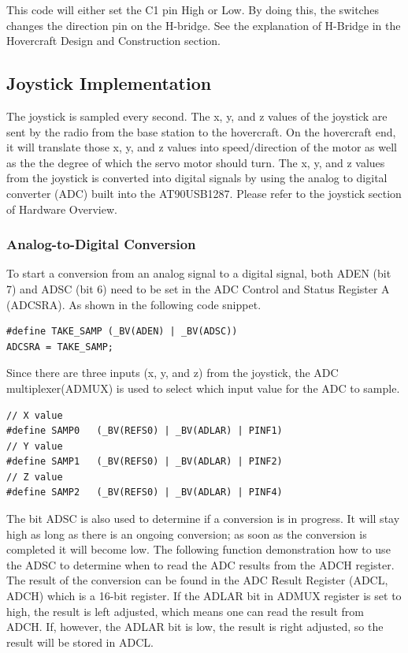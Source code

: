 This code will either set the C1 pin High or Low. By doing this, the switches changes the direction pin on the H-bridge. See the explanation of H-Bridge in the Hovercraft Design and Construction section. 

\subsection{Joystick Implementation}
The joystick is sampled every second. The x, y, and z values of the joystick are sent by the radio from the base station to the hovercraft. On the hovercraft end, it will translate those x, y, and z values into speed/direction of the motor as well as the the degree of which the servo motor should turn. The x, y, and z values from the joystick is converted into digital signals by using the analog to digital converter (ADC) built into the AT90USB1287. Please refer to the joystick section of Hardware Overview.

\subsubsection{Analog-to-Digital Conversion}
To start a conversion from an analog signal to a digital signal, both ADEN (bit 7) and ADSC (bit 6) need to be set in the ADC Control and Status Register A (ADCSRA). As shown in the following code snippet.
\begin{lstlisting}
#define TAKE_SAMP (_BV(ADEN) | _BV(ADSC))
ADCSRA = TAKE_SAMP;
\end{lstlisting}

Since there are three inputs (x, y, and z) from the joystick,  the ADC multiplexer(ADMUX) is used to select which input value for the ADC to sample.

\begin{lstlisting}
// X value
#define SAMP0 	(_BV(REFS0) | _BV(ADLAR) | PINF1)
// Y value
#define SAMP1 	(_BV(REFS0) | _BV(ADLAR) | PINF2)
// Z value
#define SAMP2 	(_BV(REFS0) | _BV(ADLAR) | PINF4)
\end{lstlisting}

The bit ADSC is also used to determine if a conversion is in progress. It will stay high as long as there is an ongoing conversion; as soon as the conversion is completed it will become low. The following function demonstration how to use the ADSC to determine when to read the ADC results from the ADCH register. The result of the conversion can be found in the ADC Result Register (ADCL, ADCH) which is a 16-bit register. If the ADLAR bit in ADMUX register is set to high, the result is left adjusted, which means one can read the result from ADCH. If, however, the ADLAR bit is low, the result is right adjusted, so the result will be stored in ADCL.

